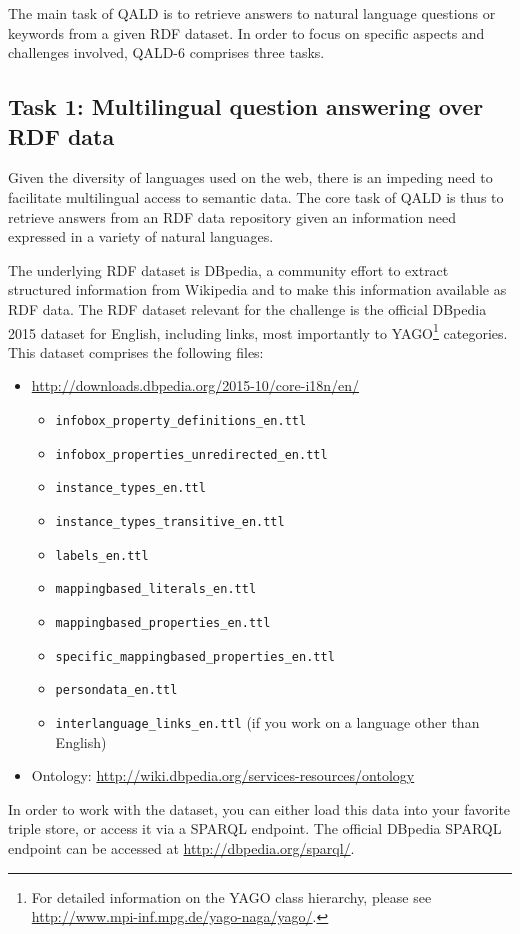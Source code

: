 The main task of QALD is to retrieve answers to natural language questions or keywords from a given RDF dataset.
In order to focus on specific aspects and challenges involved, QALD-6 comprises three tasks.

\subsection{Task 1: Multilingual question answering over RDF data}

Given the diversity of languages used on the web, there is an impeding need to facilitate multilingual access to semantic data.
The core task of QALD is thus to retrieve answers from an RDF data repository given an information need expressed in a variety of natural languages.

The underlying RDF dataset is DBpedia, a community effort to extract structured information from Wikipedia and to make this information available as RDF data.
The RDF dataset relevant for the challenge is the official DBpedia 2015 dataset for English, including links, most importantly to YAGO\footnote{For detailed information on the YAGO class hierarchy, please see \url{http://www.mpi-inf.mpg.de/yago-naga/yago/}.} categories. This dataset comprises the following files:
\begin{itemize}
\item \url{http://downloads.dbpedia.org/2015-10/core-i18n/en/}
  \begin{itemize}
  \item \texttt{infobox\_property\_definitions\_en.ttl}
  \item \texttt{infobox\_properties\_unredirected\_en.ttl}
  \item \texttt{instance\_types\_en.ttl}
  \item \texttt{instance\_types\_transitive\_en.ttl}
  \item \texttt{labels\_en.ttl}
  \item \texttt{mappingbased\_literals\_en.ttl}
  \item \texttt{mappingbased\_properties\_en.ttl}
  \item \texttt{specific\_mappingbased\_properties\_en.ttl}
  \item \texttt{persondata\_en.ttl}
  \item \texttt{interlanguage\_links\_en.ttl} (if you work on a language other than English)
\end{itemize}
\item Ontology: \url{http://wiki.dbpedia.org/services-resources/ontology}
\end{itemize}
In order to work with the dataset, you can either load this data into your favorite triple store, or access it via a SPARQL endpoint.
The official DBpedia SPARQL endpoint can be accessed at \url{http://dbpedia.org/sparql/}.

